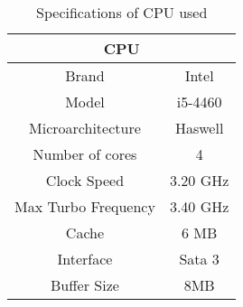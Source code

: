 

\begin{table}[H]
\centering
\begin{tabular}{|c|c|}
\hline
\multicolumn{2}{|c|}{CPU}      \\ \hline
Brand               & Intel    \\ \hline
Model               & i5-4460  \\ \hline
Microarchitecture   & Haswell  \\ \hline
Number of cores     & 4        \\ \hline
Clock Speed         & 3.20 GHz \\ \hline
Max Turbo Frequency & 3.40 GHz \\ \hline
Cache               & 6 MB     \\ \hline
Interface           & Sata 3   \\ \hline
Buffer Size         & 8MB      \\ \hline
\end{tabular}
\caption{Specifications of CPU used}\label{tab:cpuspec}

\end{table}
